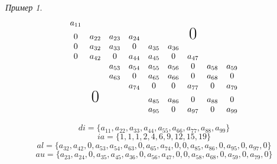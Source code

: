 \documentclass[english]{article}
\theoremstyle{plain}
\theoremstyle{remark}
\newtheorem*{examp}{Пример}
\theoremstyle{definition}
\begin{document}
\begin{examp}
\-
\[ \begin{matrix}
a_{11} & & & & & & & & \\
0 & a_{22} & a_{23} & a_{24} & & &  \text{\huge0}& &  \\
0 & a_{32} & a_{33} & 0 & a_{35} & a_{36} & & &  \\
0 & a_{42} & 0 & a_{44} & a_{45} & 0 & a_{47} & &  \\
& & a_{53} & a_{54} & a_{55} & a_{56} & 0 & a_{58} & a_{59} \\
& & a_{63} & 0 & a_{65} & a_{66} & 0 & a_{68} & 0 \\
& & & a_{74} & 0 & 0 & a_{77} & 0 & a_{79} \\
& \text{\huge0}& &  & a_{85} & a_{86} & 0 & a_{88} & 0 \\
& & &  & a_{95} & 0 & a_{97} & 0 & a_{99}
\end{matrix} \]

\[ di = \{a_{11}, a_{22}, a_{33}, a_{44}, a_{55}, a_{66}, a_{77}, a_{88}, a_{99}\} \]
\[ ia = \{1, 1, 1, 2, 4, 6, 9, 12, 15, 19\} \]
\[ al = \{a_{32}, a_{42}, 0, a_{53}, a_{54}, a_{63}, 0, a_{65}, a_{74}, 0, 0, a_{85}, a_{86}, 0, a_{95}, 0, a_{97}, 0\} \]
\[ au = \{a_{23}, a_{24}, 0, a_{35}, a_{45}, a_{36}, 0, a_{56}, a_{47}, 0, 0, a_{58}, a_{68}, 0, a_{59}, 0, a_{79}, 0\} \]
\end{examp}
\end{document}
